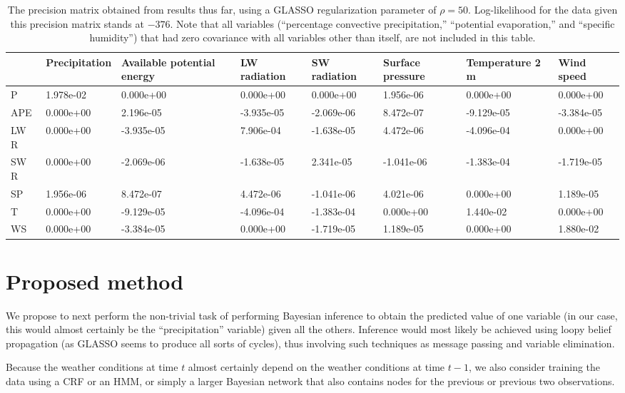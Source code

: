 \documentclass{article}
\begin{document}
\begin{table}[t]
\begin{tabular}{ p{1cm} p{2cm} p{2cm} p{2cm} p{2cm} p{2cm} p{2cm} p{2cm}}
& Precipitation & Available potential energy & LW radiation & SW radiation & Surface pressure & Temperature 2 m & Wind speed\\
\hline
P   & 1.978e-02 & 0.000e+00 & 0.000e+00 & 0.000e+00 & 1.956e-06 & 0.000e+00 & 0.000e+00\\
APE &0.000e+00 & 2.196e-05 &-3.935e-05 &-2.069e-06 & 8.472e-07 &-9.129e-05 &-3.384e-05\\
LW R&0.000e+00 &-3.935e-05 & 7.906e-04 &-1.638e-05 & 4.472e-06 &-4.096e-04 & 0.000e+00\\
SW R&0.000e+00 &-2.069e-06 &-1.638e-05 & 2.341e-05 &-1.041e-06 &-1.383e-04 &-1.719e-05\\
SP  &1.956e-06 & 8.472e-07 & 4.472e-06 &-1.041e-06 & 4.021e-06 & 0.000e+00 & 1.189e-05\\
T   &0.000e+00 &-9.129e-05 &-4.096e-04 &-1.383e-04 & 0.000e+00 & 1.440e-02 & 0.000e+00\\
WS  &0.000e+00 &-3.384e-05 & 0.000e+00 &-1.719e-05 & 1.189e-05 & 0.000e+00 & 1.880e-02\\
\end{tabular}
\caption{The precision matrix obtained from results thus far, using a GLASSO regularization parameter of $\rho = 50$. Log-likelihood for the data given this precision matrix stands at $-376$. Note that all variables (``percentage convective precipitation,'' ``potential evaporation,'' and ``specific humidity'') that had zero covariance with all variables other than itself, are not included in this table.}
\label{tab:precision}
\end{table}

\section{Proposed method}

We propose to next perform the non-trivial task of performing Bayesian inference to obtain the predicted value of one variable (in our case, this would almost certainly be the ``precipitation'' variable) given all the others. Inference would most likely be achieved using loopy belief propagation (as GLASSO seems to produce all sorts of cycles), thus involving such techniques as message passing and variable elimination.

Because the weather conditions at time $t$ almost certainly depend on the weather conditions at time $t - 1$, we also consider training the data using a CRF or an HMM, or simply a larger Bayesian network that also contains nodes for the previous or previous two observations.
\end{document}
